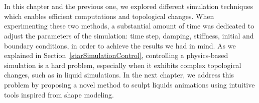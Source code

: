 \\
\\
In this chapter and the previous one, we explored different simulation techniques which enables efficient computations and topological changes. 
When experimenting these two methods, a substantial amount of time was dedicated to adjust the parameters of the simulation: time step, damping, stiffness, initial and boundary conditions, in order to achieve the results we had in mind.
As we explained in Section~\ref{starSimulationControl}, controlling a physics-based simulation is a hard problem, especially when it exhibits complex topological changes, such as in liquid simulations.
In the next chapter, we address this problem by proposing a novel method to sculpt liquids animations using intuitive tools inspired from shape modeling.
